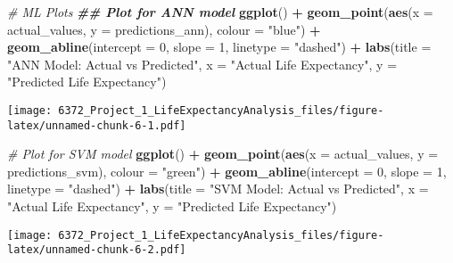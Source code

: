 \documentclass[
]{article}
\newenvironment{Shaded}{\begin{snugshade}}{\end{snugshade}}
\newcommand{\AttributeTok}[1]{\textcolor[rgb]{0.13,0.29,0.53}{#1}}
\newcommand{\CommentTok}[1]{\textcolor[rgb]{0.56,0.35,0.01}{\textit{#1}}}
\newcommand{\DecValTok}[1]{\textcolor[rgb]{0.00,0.00,0.81}{#1}}
\newcommand{\DocumentationTok}[1]{\textcolor[rgb]{0.56,0.35,0.01}{\textbf{\textit{#1}}}}
\newcommand{\FunctionTok}[1]{\textcolor[rgb]{0.13,0.29,0.53}{\textbf{#1}}}
\newcommand{\NormalTok}[1]{#1}
\newcommand{\SpecialCharTok}[1]{\textcolor[rgb]{0.81,0.36,0.00}{\textbf{#1}}}
\newcommand{\StringTok}[1]{\textcolor[rgb]{0.31,0.60,0.02}{#1}}
\begin{document}
\begin{Shaded}
\begin{Highlighting}[]
\CommentTok{\# ML Plots}
\DocumentationTok{\#\# Plot for ANN model}
\FunctionTok{ggplot}\NormalTok{() }\SpecialCharTok{+}
  \FunctionTok{geom\_point}\NormalTok{(}\FunctionTok{aes}\NormalTok{(}\AttributeTok{x =}\NormalTok{ actual\_values, }\AttributeTok{y =}\NormalTok{ predictions\_ann), }\AttributeTok{colour =} \StringTok{"blue"}\NormalTok{) }\SpecialCharTok{+}
  \FunctionTok{geom\_abline}\NormalTok{(}\AttributeTok{intercept =} \DecValTok{0}\NormalTok{, }\AttributeTok{slope =} \DecValTok{1}\NormalTok{, }\AttributeTok{linetype =} \StringTok{"dashed"}\NormalTok{) }\SpecialCharTok{+}
  \FunctionTok{labs}\NormalTok{(}\AttributeTok{title =} \StringTok{"ANN Model: Actual vs Predicted"}\NormalTok{, }\AttributeTok{x =} \StringTok{"Actual Life Expectancy"}\NormalTok{, }\AttributeTok{y =} \StringTok{"Predicted Life Expectancy"}\NormalTok{)}
\end{Highlighting}
\end{Shaded}

\texttt{[image: 6372\_Project\_1\_LifeExpectancyAnalysis\_files/figure-latex/unnamed-chunk-6-1.pdf]}

\begin{Shaded}
\begin{Highlighting}[]
\CommentTok{\# Plot for SVM model}
\FunctionTok{ggplot}\NormalTok{() }\SpecialCharTok{+}
  \FunctionTok{geom\_point}\NormalTok{(}\FunctionTok{aes}\NormalTok{(}\AttributeTok{x =}\NormalTok{ actual\_values, }\AttributeTok{y =}\NormalTok{ predictions\_svm), }\AttributeTok{colour =} \StringTok{"green"}\NormalTok{) }\SpecialCharTok{+}
  \FunctionTok{geom\_abline}\NormalTok{(}\AttributeTok{intercept =} \DecValTok{0}\NormalTok{, }\AttributeTok{slope =} \DecValTok{1}\NormalTok{, }\AttributeTok{linetype =} \StringTok{"dashed"}\NormalTok{) }\SpecialCharTok{+}
  \FunctionTok{labs}\NormalTok{(}\AttributeTok{title =} \StringTok{"SVM Model: Actual vs Predicted"}\NormalTok{, }\AttributeTok{x =} \StringTok{"Actual Life Expectancy"}\NormalTok{, }\AttributeTok{y =} \StringTok{"Predicted Life Expectancy"}\NormalTok{)}
\end{Highlighting}
\end{Shaded}

\texttt{[image: 6372\_Project\_1\_LifeExpectancyAnalysis\_files/figure-latex/unnamed-chunk-6-2.pdf]}
\end{document}
